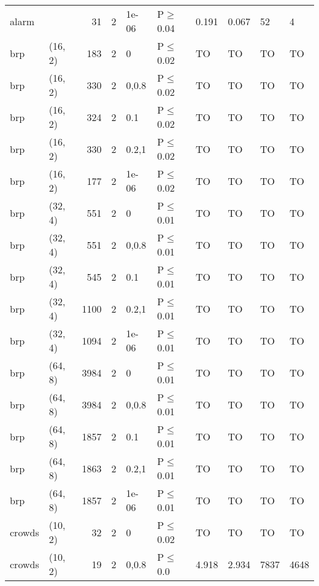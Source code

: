 \begin{longtable}{llrrllllll}
 alarm         &           &     	31 &   2 & 1e-06 & P$\geq$0.04  & 0.191    & 0.067    & 52      & 4      \\
 brp           & (16, 2)   &    	183 &   2 & 0     & P$\leq$0.02  & TO       & TO       & TO      & TO     \\
 brp           & (16, 2)   &    	330 &   2 & 0,0.8 & P$\leq$0.02  & TO       & TO       & TO      & TO     \\
 brp           & (16, 2)   &    	324 &   2 & 0.1   & P$\leq$0.02  & TO       & TO       & TO      & TO     \\
 brp           & (16, 2)   &    	330 &   2 & 0.2,1 & P$\leq$0.02  & TO       & TO       & TO      & TO     \\
 brp           & (16, 2)   &    	177 &   2 & 1e-06 & P$\leq$0.02  & TO       & TO       & TO      & TO     \\
 brp           & (32, 4)   &    	551 &   2 & 0     & P$\leq$0.01  & TO       & TO       & TO      & TO     \\
 brp           & (32, 4)   &    	551 &   2 & 0,0.8 & P$\leq$0.01  & TO       & TO       & TO      & TO     \\
 brp           & (32, 4)   &    	545 &   2 & 0.1   & P$\leq$0.01  & TO       & TO       & TO      & TO     \\
 brp           & (32, 4)   &   	1100 &   2 & 0.2,1 & P$\leq$0.01  & TO       & TO       & TO      & TO     \\
 brp           & (32, 4)   &   	1094 &   2 & 1e-06 & P$\leq$0.01  & TO       & TO       & TO      & TO     \\
 brp           & (64, 8)   &   	3984 &   2 & 0     & P$\leq$0.01  & TO       & TO       & TO      & TO     \\
 brp           & (64, 8)   &   	3984 &   2 & 0,0.8 & P$\leq$0.01  & TO       & TO       & TO      & TO     \\
 brp           & (64, 8)   &   	1857 &   2 & 0.1   & P$\leq$0.01  & TO       & TO       & TO      & TO     \\
 brp           & (64, 8)   &   	1863 &   2 & 0.2,1 & P$\leq$0.01  & TO       & TO       & TO      & TO     \\
 brp           & (64, 8)   &   	1857 &   2 & 1e-06 & P$\leq$0.01  & TO       & TO       & TO      & TO     \\
 crowds        & (10, 2)   &     	32 &   2 & 0     & P$\leq$0.02  & TO       & TO       & TO      & TO     \\
 crowds        & (10, 2)   &     	19 &   2 & 0,0.8 & P$\leq$0.0   & 4.918    & 2.934    & 7837    & 4648   \\

\end{longtable}
